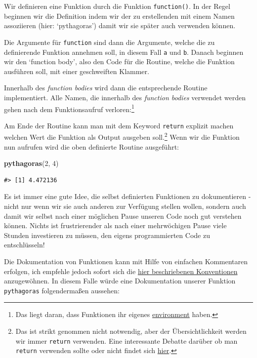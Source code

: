 \documentclass[]{tufte-book}
\newenvironment{Shaded}{}{}
\newcommand{\KeywordTok}[1]{\textcolor[rgb]{0.00,0.44,0.13}{\textbf{#1}}}
\newcommand{\DecValTok}[1]{\textcolor[rgb]{0.25,0.63,0.44}{#1}}
\newcommand{\NormalTok}[1]{#1}
\begin{document}
Wir definieren eine Funktion durch die Funktion \texttt{function()}. In
der Regel beginnen wir die Definition indem wir der zu erstellenden mit
einem Namen assoziieren (hier: `pythagoras') damit wir sie später auch
verwenden können.

Die Argumente für \texttt{function} sind dann die Argumente, welche die
zu definierende Funktion annehmen soll, in diesem Fall \texttt{a} und
\texttt{b}. Danach beginnen wir den `function body', also den Code für
die Routine, welche die Funktion ausführen soll, mit einer geschweiften
Klammer.

Innerhalb des \emph{function bodies} wird dann die entsprechende Routine
implementiert. Alle Namen, die innerhalb des \emph{function bodies}
verwendet werden gehen nach dem Funktionsaufruf verloren:\footnote{Das
  liegt daran, dass Funktionen ihr eigenes
  \href{https://adv-r.hadley.nz/environments.html}{environment} haben.}

Am Ende der Routine kann man mit dem Keyword \texttt{return} explizit
machen welchen Wert die Funktion als Output ausgeben soll.\footnote{Das
  ist strikt genommen nicht notwendig, aber der Übersichtlichkeit werden
  wir immer \texttt{return} verwenden. Eine interessante Debatte darüber
  ob man \texttt{return} verwenden sollte oder nicht findet sich
  \href{https://stackoverflow.com/questions/11738823/explicitly-calling-return-in-a-function-or-not}{hier}.}
Wenn wir die Funktion nun aufrufen wird die oben definierte Routine
ausgeführt:

\begin{Shaded}
\begin{Highlighting}[]
\KeywordTok{pythagoras}\NormalTok{(}\DecValTok{2}\NormalTok{, }\DecValTok{4}\NormalTok{)}
\end{Highlighting}
\end{Shaded}

\begin{verbatim}
#> [1] 4.472136
\end{verbatim}

Es ist immer eine gute Idee, die selbst definierten Funktionen zu
dokumentieren - nicht nur wenn wir sie auch anderen zur Verfügung
stellen wollen, sondern auch damit wir selbst nach einer möglichen Pause
unseren Code noch gut verstehen können. Nichts ist frustrierender als
nach einer mehrwöchigen Pause viele Stunden investieren zu müssen, den
eigens programmierten Code zu entschlüsseln!

Die Dokumentation von Funktionen kann mit Hilfe von einfachen
Kommentaren erfolgen, ich empfehle jedoch sofort sich die
\href{https://r-pkgs.org/man.html\#man-functions}{hier beschriebenen
Konventionen} anzugewöhnen. In diesem Falle würde eine Dokumentation
unserer Funktion \texttt{pythagoras} folgendermaßen aussehen:
\end{document}
